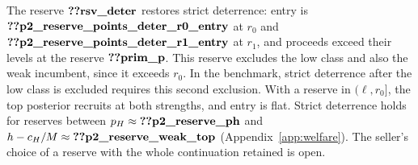 The reserve \(\reg{rsv_deter}\) restores strict deterrence: entry is \(\reg{p2_reserve_points_deter_r0_entry}\) at
\(r_0\) and \(\reg{p2_reserve_points_deter_r1_entry}\) at \(r_1\), and proceeds exceed their levels at the reserve
\(\reg{prim_p}\). This reserve excludes the low class and also the weak incumbent, since it exceeds \(r_0\). In the
benchmark, strict deterrence after the low class is excluded requires this second exclusion. With a reserve in
\((\ell,r_0]\), the top posterior recruits at both strengths, and entry is flat. Strict deterrence holds for reserves
between \(p_H\approx\reg{p2_reserve_ph}\) and \(h-c_H/M\approx\reg{p2_reserve_weak_top}\) (Appendix~\ref{app:welfare}).
The seller's choice of a reserve with the whole continuation retained is open.
